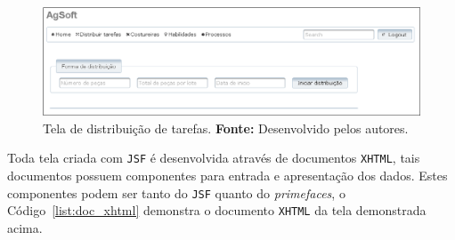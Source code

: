 \newpage

\begin{figure}[h!]
	\centerline{\includegraphics[scale=0.5]{./imagens/tela_distribuicao_open.png}}
	\caption[Tela de distribuição de tarefas.]
	{Tela de distribuição de tarefas.
		\textbf{Fonte:} Desenvolvido pelos autores.}
	\label{fig:tela_dis_open}
\end{figure}

\par Toda tela criada com \texttt{JSF} é desenvolvida através de documentos \texttt{XHTML}, tais documentos possuem componentes para entrada e apresentação dos dados. Estes componentes podem ser tanto do \texttt{JSF} quanto do \textit{primefaces}, o Código~\ref{list:doc_xhtml} demonstra o documento \texttt{XHTML} da tela demonstrada acima.

